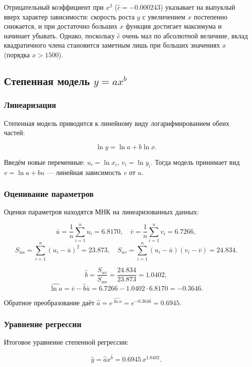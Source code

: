 Отрицательный коэффициент при \(x^2\) (\(\hat{c} = -0.000243\)) указывает на выпуклый вверх характер зависимости: скорость роста \(y\) с увеличением \(x\) постепенно снижается, и при достаточно больших \(x\) функция достигает максимума и начинает убывать. Однако, поскольку \(\hat{c}\) очень мал по абсолютной величине, вклад квадратичного члена становится заметным лишь при больших значениях \(x\) (порядка \(x > 1500\)).

\subsection{Степенная модель \(y = ax^b\)}

\subsubsection{Линеаризация}

Степенная модель приводится к линейному виду логарифмированием обеих частей:

\[
\ln y = \ln a + b \ln x.
\]

Введём новые переменные: \(u_i = \ln x_i\), \(v_i = \ln y_i\). Тогда модель принимает вид \(v = \ln a + b u\) — линейная зависимость \(v\) от \(u\).

\subsubsection{Оценивание параметров}

Оценки параметров находятся МНК на линеаризованных данных:

\[
\bar{u} = \frac{1}{n}\sum_{i=1}^{n} u_i = 6.8170, \quad
\bar{v} = \frac{1}{n}\sum_{i=1}^{n} v_i = 6.7266,
\]
\[
S_{uu} = \sum_{i=1}^{n}(u_i - \bar{u})^2 = 23.873, \quad
S_{uv} = \sum_{i=1}^{n}(u_i - \bar{u})(v_i - \bar{v}) = 24.834.
\]

\[
\hat{b} = \frac{S_{uv}}{S_{uu}} = \frac{24.834}{23.873} = 1.0402,
\]
\[
\widehat{\ln a} = \bar{v} - \hat{b}\bar{u} = 6.7266 - 1.0402 \cdot 6.8170 = -0.3646.
\]

Обратное преобразование даёт \(\hat{a} = e^{\widehat{\ln a}} = e^{-0.3646} = 0.6945\).

\subsubsection{Уравнение регрессии}

Итоговое уравнение степенной регрессии:

\[
\hat{y} = \hat{a} x^{\hat{b}} = 0.6945 \, x^{1.0402}.
\]

